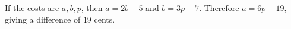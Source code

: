 If the costs are $a,b,p$, then $a=2b-5$ and $b=3p-7$. Therefore $a=6p-19$, giving a difference of $\boxed{19}$ cents.
